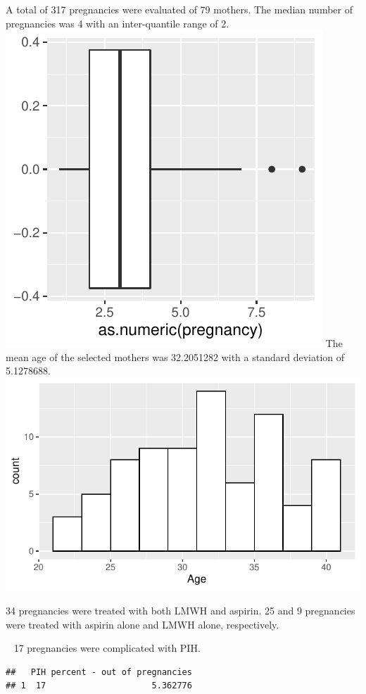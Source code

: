 \documentclass[
]{article}
\begin{document}
A total of 317 pregnancies were evaluated of 79 mothers. The median
number of pregnancies was 4 with an inter-quantile range of 2.
\includegraphics{Figs/unnamed-chunk-27-1.pdf} The mean age of the
selected mothers was 32.2051282 with a standard deviation of 5.1278688.
\includegraphics{Figs/unnamed-chunk-28-1.pdf}

34 pregnancies were treated with both LMWH and aspirin. 25 and 9
pregnancies were treated with aspirin alone and LMWH alone,
respectively.

~ 17 pregnancies were complicated with PIH.

\begin{verbatim}
##   PIH percent - out of pregnancies
## 1  17                     5.362776
\end{verbatim}
\end{document}
